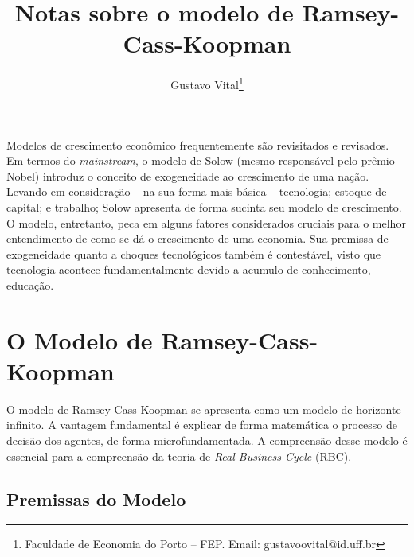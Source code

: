 \documentclass[11pt,a4paper]{article}
\author{Gustavo Vital\thanks{Faculdade de Economia do Porto -- FEP. Email: gustavoovital@id.uff.br}}
\title{Notas sobre o modelo de Ramsey-Cass-Koopman}
\begin{document}
\maketitle

Modelos de crescimento econômico frequentemente são revisitados e revisados. Em termos do \textit{mainstream}, o modelo de Solow (mesmo responsável pelo prêmio Nobel) introduz o conceito de exogeneidade ao crescimento de uma nação. Levando em consideração -- na sua forma mais básica -- tecnologia; estoque de capital; e trabalho; Solow apresenta de forma sucinta seu modelo de crescimento. O modelo, entretanto, peca em alguns fatores considerados cruciais para o melhor entendimento de como se dá o crescimento de uma economia. Sua premissa de exogeneidade quanto a choques tecnológicos também é contestável, visto que tecnologia acontece fundamentalmente devido a acumulo de conhecimento, educação.

\section{O Modelo de Ramsey-Cass-Koopman}  

O modelo de Ramsey-Cass-Koopman se apresenta como um modelo de horizonte infinito. A vantagem fundamental é explicar de forma matemática o processo de decisão dos agentes, de forma microfundamentada. A compreensão desse modelo é essencial para a compreensão da teoria de \textit{Real Business Cycle} (RBC).

\subsection{Premissas do Modelo}
\end{document}
